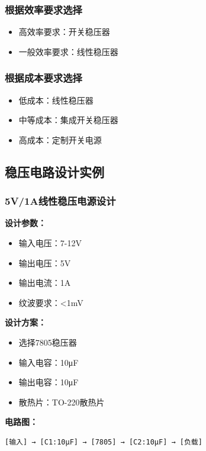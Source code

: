 \documentclass[12pt,UTF8]{ctexbook}
\begin{document}
\subsubsection{根据效率要求选择}
\begin{itemize}
    \item 高效率要求：开关稳压器
    \item 一般效率要求：线性稳压器
\end{itemize}

\subsubsection{根据成本要求选择}
\begin{itemize}
    \item 低成本：线性稳压器
    \item 中等成本：集成开关稳压器
    \item 高成本：定制开关电源
\end{itemize}

\subsection{稳压电路设计实例}

\subsubsection{5V/1A线性稳压电源设计}

\textbf{设计参数：}
\begin{itemize}
    \item 输入电压：7-12V
    \item 输出电压：5V
    \item 输出电流：1A
    \item 纹波要求：<1mV
\end{itemize}

\textbf{设计方案：}
\begin{itemize}
    \item 选择7805稳压器
    \item 输入电容：10μF
    \item 输出电容：10μF
    \item 散热片：TO-220散热片
\end{itemize}

\textbf{电路图：}

\begin{verbatim}
[输入] → [C1:10μF] → [7805] → [C2:10μF] → [负载]
\end{verbatim}
\end{document}
